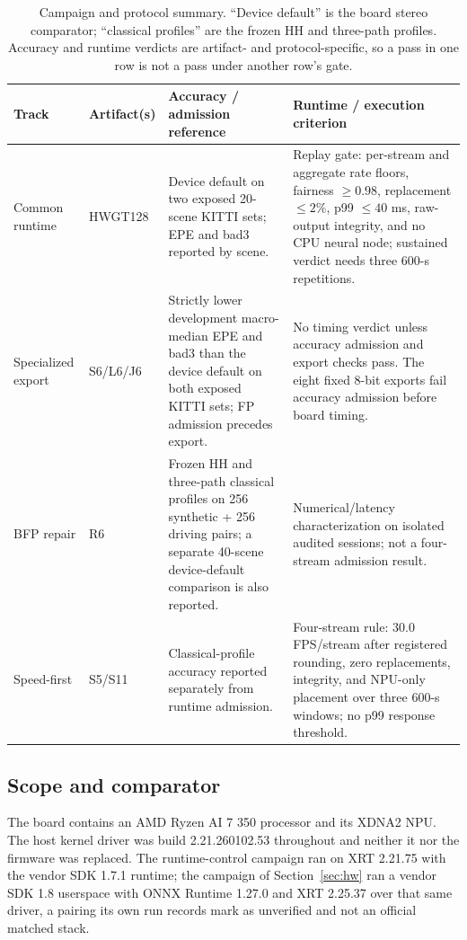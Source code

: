 \documentclass[sigconf,review,anonymous]{acmart}
\begin{document}
\begin{table}[t]
\centering
\footnotesize
\caption{Campaign and protocol summary. ``Device default'' is the board stereo comparator; ``classical profiles'' are the frozen HH and three-path profiles. Accuracy and runtime verdicts are artifact- and protocol-specific, so a pass in one row is not a pass under another row's gate.}
\label{tab:campaigns}
\begin{tabular}{p{}p{}p{}p{}}
\hline
Track & Artifact(s) & Accuracy / admission reference & Runtime / execution criterion\\
\hline
Common runtime & HWGT128 & Device default on two exposed 20-scene KITTI sets; EPE and bad3 reported by scene. & Replay gate: per-stream and aggregate rate floors, fairness $\ge0.98$, replacement $\le2\%$, p99 $\le40$ ms, raw-output integrity, and no CPU neural node; sustained verdict needs three 600-s repetitions.\\
Specialized export & S6/L6/J6 & Strictly lower development macro-median EPE and bad3 than the device default on both exposed KITTI sets; FP admission precedes export. & No timing verdict unless accuracy admission and export checks pass. The eight fixed 8-bit exports fail accuracy admission before board timing.\\
BFP repair & R6 & Frozen HH and three-path classical profiles on 256 synthetic + 256 driving pairs; a separate 40-scene device-default comparison is also reported. & Numerical/latency characterization on isolated audited sessions; not a four-stream admission result.\\
Speed-first & S5/S11 & Classical-profile accuracy reported separately from runtime admission. & Four-stream rule: 30.0 FPS/stream after registered rounding, zero replacements, integrity, and NPU-only placement over three 600-s windows; no p99 response threshold.\\
\hline
\end{tabular}
\end{table}

\subsection{Scope and comparator}
\label{sec:scope}
The board contains an AMD Ryzen AI 7 350 processor and its XDNA2 NPU. The host kernel driver was build 2.21.260102.53 throughout and neither it nor the firmware was replaced. The runtime-control campaign ran on XRT 2.21.75 with the vendor SDK 1.7.1 runtime; the campaign of Section~\ref{sec:hw} ran a vendor SDK 1.8 userspace with ONNX Runtime 1.27.0 and XRT 2.25.37 over that same driver, a pairing its own run records mark as unverified and not an official matched stack.
\end{document}
